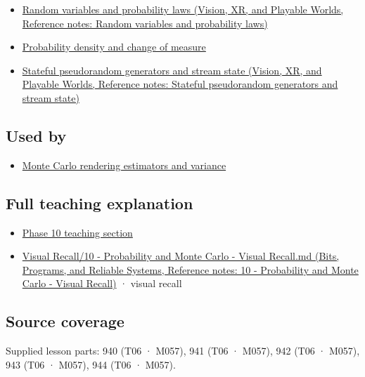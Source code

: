 \begin{itemize}
\tightlist
\item
  \href{../07-Vision-XR-and-Playable-Worlds/main.pdf\#nameddest=appendix-4d0203f7944f}{Random variables and probability laws (Vision, XR, and Playable Worlds, Reference notes: Random variables and probability laws)}
\item
  \hyperref[appendix-4815cd87ab8b]{Probability density and change of measure}
\item
  \href{../07-Vision-XR-and-Playable-Worlds/main.pdf\#nameddest=appendix-e0f7c7e08f3a}{Stateful pseudorandom generators and stream state (Vision, XR, and Playable Worlds, Reference notes: Stateful pseudorandom generators and stream state)}
\end{itemize}

\subsection{Used by}\label{appendix-8d863ed954d0-used-by}

\hypertarget{appendix-8d863ed954d0-used-by}{}

\begin{itemize}
\tightlist
\item
  \hyperref[appendix-031e02bf28af]{Monte Carlo rendering estimators and variance}
\end{itemize}

\subsection{Full teaching explanation}\label{appendix-8d863ed954d0-full-teaching-explanation}

\hypertarget{appendix-8d863ed954d0-full-teaching-explanation}{}

\begin{itemize}
\tightlist
\item
  \hyperref[02-foundations-ii-ch029-transformations-turn-simple-inputs-into-useful-samples]{Phase 10 teaching section}
\item
  \href{../01-Bits-Programs-and-Reliable-Systems/main.pdf\#nameddest=appendix-cb5af353ef77}{Visual Recall/10 - Probability and Monte Carlo - Visual Recall.md (Bits, Programs, and Reliable Systems, Reference notes: 10 - Probability and Monte Carlo - Visual Recall)} · visual recall
\end{itemize}

\subsection{Source coverage}\label{appendix-8d863ed954d0-source-coverage}

\hypertarget{appendix-8d863ed954d0-source-coverage}{}

Supplied lesson parts: 940 (T06 · M057), 941 (T06 · M057), 942 (T06 · M057), 943 (T06 · M057), 944 (T06 · M057).
